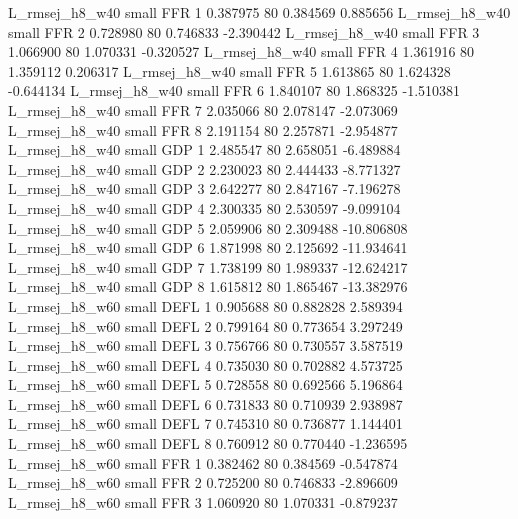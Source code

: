 L_rmsej_h8_w40      small      FFR                 1 0.387975 80       0.384569           0.885656
L_rmsej_h8_w40      small      FFR                 2 0.728980 80       0.746833          -2.390442
L_rmsej_h8_w40      small      FFR                 3 1.066900 80       1.070331          -0.320527
L_rmsej_h8_w40      small      FFR                 4 1.361916 80       1.359112           0.206317
L_rmsej_h8_w40      small      FFR                 5 1.613865 80       1.624328          -0.644134
L_rmsej_h8_w40      small      FFR                 6 1.840107 80       1.868325          -1.510381
L_rmsej_h8_w40      small      FFR                 7 2.035066 80       2.078147          -2.073069
L_rmsej_h8_w40      small      FFR                 8 2.191154 80       2.257871          -2.954877
L_rmsej_h8_w40      small      GDP                 1 2.485547 80       2.658051          -6.489884
L_rmsej_h8_w40      small      GDP                 2 2.230023 80       2.444433          -8.771327
L_rmsej_h8_w40      small      GDP                 3 2.642277 80       2.847167          -7.196278
L_rmsej_h8_w40      small      GDP                 4 2.300335 80       2.530597          -9.099104
L_rmsej_h8_w40      small      GDP                 5 2.059906 80       2.309488         -10.806808
L_rmsej_h8_w40      small      GDP                 6 1.871998 80       2.125692         -11.934641
L_rmsej_h8_w40      small      GDP                 7 1.738199 80       1.989337         -12.624217
L_rmsej_h8_w40      small      GDP                 8 1.615812 80       1.865467         -13.382976
L_rmsej_h8_w60      small     DEFL                 1 0.905688 80       0.882828           2.589394
L_rmsej_h8_w60      small     DEFL                 2 0.799164 80       0.773654           3.297249
L_rmsej_h8_w60      small     DEFL                 3 0.756766 80       0.730557           3.587519
L_rmsej_h8_w60      small     DEFL                 4 0.735030 80       0.702882           4.573725
L_rmsej_h8_w60      small     DEFL                 5 0.728558 80       0.692566           5.196864
L_rmsej_h8_w60      small     DEFL                 6 0.731833 80       0.710939           2.938987
L_rmsej_h8_w60      small     DEFL                 7 0.745310 80       0.736877           1.144401
L_rmsej_h8_w60      small     DEFL                 8 0.760912 80       0.770440          -1.236595
L_rmsej_h8_w60      small      FFR                 1 0.382462 80       0.384569          -0.547874
L_rmsej_h8_w60      small      FFR                 2 0.725200 80       0.746833          -2.896609
L_rmsej_h8_w60      small      FFR                 3 1.060920 80       1.070331          -0.879237
